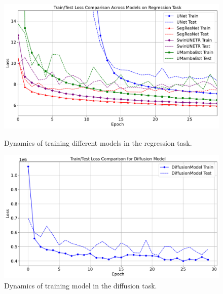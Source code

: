 \documentclass{article}
\begin{document}
\begin{figure}[h!]
    \centering

    \begin{minipage}[t]{0.48\linewidth}
        \centering
        \includegraphics[width=\linewidth]{images/reg_loss_plot.pdf}
        \caption{Dynamics of training different models in the regression task.}
        \label{fig:reg_loss}
    \end{minipage}
    \hfill
    \begin{minipage}[t]{0.48\linewidth}
        \centering
        \includegraphics[width=\linewidth]{images/dif_loss_plot.pdf}
        \caption{Dynamics of training model in the diffusion task.}
        \label{fig:dif_loss}
    \end{minipage}

    \vspace{1em}


\end{figure}
\end{document}
